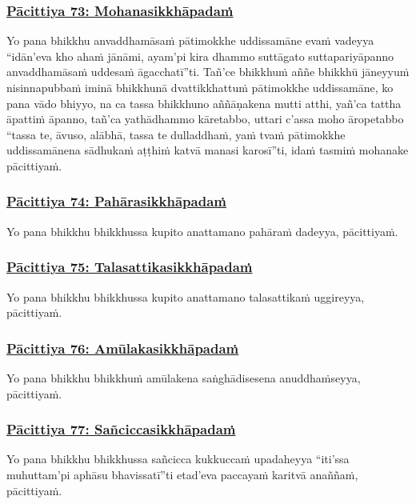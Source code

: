 \subsubsection*{\hyperref[exp73]{Pācittiya 73: Mohanasikkhāpadaṁ}}
\label{pac73}

Yo pana bhikkhu anvaddhamāsaṁ pātimokkhe uddissamāne evaṁ vadeyya “idān'eva kho ahaṁ jānāmi, ayam'pi kira dhammo suttāgato suttapariyāpanno anvaddhamāsaṁ uddesaṁ āgacchatī”ti. Tañ'ce bhikkhuṁ aññe bhikkhū jāneyyuṁ nisinnapubbaṁ iminā bhikkhunā dvattikkhattuṁ pātimokkhe uddissamāne, ko pana vādo bhiyyo, na ca tassa bhikkhuno aññāṇakena mutti atthi, yañ'ca tattha āpattiṁ āpanno, tañ'ca yathādhammo kāretabbo, uttari c'assa moho āropetabbo “tassa te, āvuso, alābhā, tassa te dulladdhaṁ, yaṁ tvaṁ pātimokkhe uddissamānena sādhukaṁ aṭṭhiṁ katvā manasi karosī”ti, idaṁ tasmiṁ mohanake pācittiyaṁ.

\subsubsection*{\hyperref[exp74]{Pācittiya 74: Pahārasikkhāpadaṁ}}
\label{pac74}

Yo pana bhikkhu bhikkhussa kupito anattamano pahāraṁ dadeyya, pācittiyaṁ.

\subsubsection*{\hyperref[exp75]{Pācittiya 75: Talasattikasikkhāpadaṁ}}
\label{pac75}

Yo pana bhikkhu bhikkhussa kupito anattamano talasattikaṁ uggireyya, pācittiyaṁ.

\subsubsection*{\hyperref[exp76]{Pācittiya 76: Amūlakasikkhāpadaṁ}}
\label{pac76}

Yo pana bhikkhu bhikkhuṁ amūlakena saṅghādisesena anuddhaṁseyya, pācittiyaṁ.

\subsubsection*{\hyperref[exp77]{Pācittiya 77: Sañciccasikkhāpadaṁ}}
\label{pac77}

Yo pana bhikkhu bhikkhussa sañcicca kukkuccaṁ upadaheyya “iti'ssa muhuttam'pi aphāsu bhavissatī”ti etad'eva paccayaṁ karitvā anaññaṁ, pācittiyaṁ.

